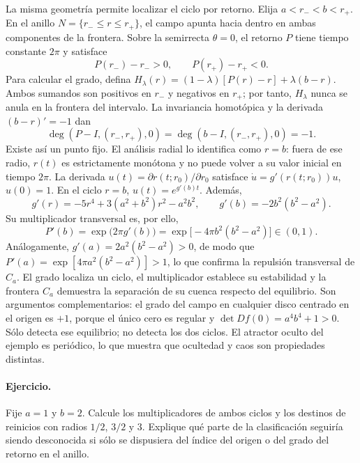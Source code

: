 La misma geometría permite localizar el ciclo por retorno. Elija
\(a<r_-<b<r_+\). En el anillo
\(N=\{r_-\leq r\leq r_+\}\), el campo apunta hacia dentro en ambas
componentes de la frontera. Sobre la semirrecta \(\theta=0\), el retorno
\(P\) tiene tiempo constante \(2\pi\) y satisface
\[
 P(r_-)-r_->0,\qquad P(r_+)-r_+<0.
\]
Para calcular el grado, defina
\(H_\lambda(r)=(1-\lambda)[P(r)-r]+\lambda(b-r)\).
Ambos sumandos son positivos en \(r_-\) y negativos en \(r_+\);
por tanto, \(H_\lambda\) nunca se anula en la frontera del intervalo.
La invariancia homotópica y la derivada \((b-r)'=-1\) dan
\[
 \deg(P-I,(r_-,r_+),0)
 =\deg(b-I,(r_-,r_+),0)=-1.
\]
Existe así un punto fijo. El análisis radial lo identifica como \(r=b\):
fuera de ese radio, \(r(t)\) es estrictamente monótona y no puede volver
a su valor inicial en tiempo \(2\pi\).
La derivada \(u(t)=\partial r(t;r_0)/\partial r_0\) satisface
\(\dot u=g'(r(t;r_0))u\), \(u(0)=1\). En el ciclo \(r=b\),
\(u(t)=e^{g'(b)t}\). Además,
\[
 g'(r)=-5r^4+3(a^2+b^2)r^2-a^2b^2,\qquad
 g'(b)=-2b^2(b^2-a^2).
\]
Su multiplicador transversal es, por ello,
\begin{equation}
 P'(b)=\exp\bigl(2\pi g'(b)\bigr)
 =\exp\bigl[-4\pi b^2(b^2-a^2)\bigr]\in(0,1).
 \label{eq:guide-hidden-cycle-multiplier}
\end{equation}
Análogamente, \(g'(a)=2a^2(b^2-a^2)>0\), de modo que
\(P'(a)=\exp[4\pi a^2(b^2-a^2)]>1\), lo que confirma la
repulsión transversal de \(C_a\).
El grado localiza un ciclo, el multiplicador establece su estabilidad y la
frontera \(C_a\) demuestra la separación de su cuenca respecto del
equilibrio. Son argumentos complementarios: el grado del campo en cualquier
disco centrado en el origen es \(+1\), porque el único cero es regular y
\(\det Df(0)=a^4b^4+1>0\). Sólo detecta ese equilibrio; no
detecta los dos ciclos. El atractor oculto del ejemplo es periódico, lo que
muestra que ocultedad y caos son propiedades distintas.



\ifHAFOPedagogy
\paragraph{Ejercicio.}
Fije \(a=1\) y \(b=2\). Calcule los multiplicadores de ambos ciclos y
los destinos de reinicios con radios \(1/2\), \(3/2\) y \(3\).
Explique qué parte de la clasificación seguiría siendo desconocida si sólo
se dispusiera del índice del origen o del grado del retorno en el anillo.
\fi

